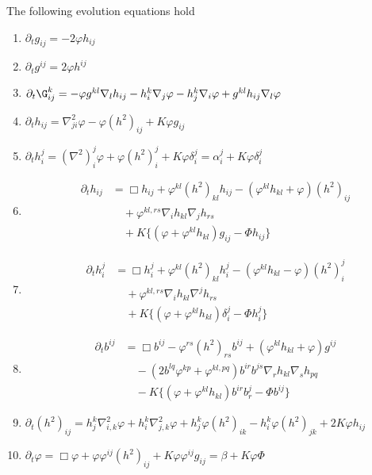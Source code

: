 \documentclass{amsart}
\begin{document}
\begin{lemma}
\label{lem:evolution}
The following evolution equations hold
\begin{enumerate}
\item \label{eq:delt_metric} $\partial_tg_{ij} = -2\varphi h_{ij}$
\item \label{eq:delt_inversemetric} $\partial_t g^{ij} = 2\varphi h^{ij}$
\item \label{eq:delt_christoffel} $\partial_t {\G}^{k}_{ij} = -\varphi g^{kl} \nabla_l h_{ij} - h^k_i \nabla_j \varphi - h^k_j \nabla_i \varphi + g^{kl} h_{ij} \nabla_l \varphi$
\item \label{eq:delt_sff} $\partial_t h_{ij} = \nabla^2_{ji} \varphi - \varphi(h^2)_{ij} + K \varphi g_{ij}$
\item \label{eq:delt_weingarten} $\partial_t h_i^j = (\nabla^2)^j_i\varphi + \varphi(h^2)_i^j + K \varphi\delta_i^j = \alpha^j_i + K \varphi\delta_i^j$
\item \label{eq:delt_sff_box} \begin{align*}
\partial_t h_{ij} &= \Box h_{ij} + \varphi^{kl} (h^2)_{kl} h_{ij} - (\varphi^{kl}h_{kl} + \varphi) (h^2)_{ij} \\
& \quad + \varphi^{kl,rs}\nabla_i h_{kl}\nabla_j h_{rs} \\
& \quad + K \{(\varphi + \varphi^{kl}h_{kl}) g_{ij} - \Phi h_{ij}\}
\end{align*}
\item \label{eq:delt_weingarten_box} \begin{align*}
\partial_t h_i^j &= \Box h_i^j + \varphi^{kl} (h^2)_{kl} h_i^j - (\varphi^{kl}h_{kl} - \varphi) (h^2)_i^j \\
& \quad + \varphi^{kl,rs}\nabla_i h_{kl}\nabla^j h_{rs} \\
& \quad + K \{(\varphi + \varphi^{kl}h_{kl}) \delta_i^j - \Phi h_i^j\}
\end{align*}
\item \label{eq:delt_inversesff} \begin{align*}
\partial_t b^{ij} &= \Box b^{ij} - \varphi^{rs} (h^2)_{rs} b^{ij} + (\varphi^{kl}h_{kl} + \varphi) g^{ij} \\  
& \quad - \left(2b^{lq}\varphi^{kp} + \varphi^{kl,pq}\right) b^{ir}b^{js} \nabla_r h_{kl} \nabla_s h_{pq} \\
& \quad - K \{(\varphi + \varphi^{kl}h_{kl}) b^{ir}b^{j}_{r} - \Phi b^{ij}\}
\end{align*}
\item \label{eq:delt_squaredsff} $\partial_t (h^2)_{ij} = h^k_j \nabla^2_{i,k} \varphi + h^k_i \nabla^2_{j,k} \varphi + h^k_j \varphi(h^2)_{ik} - h^k_i \varphi(h^2)_{jk} + 2K\varphi h_{ij}$
\item \label{eq:delt_speed} $\partial_t \varphi = \Box \varphi + \varphi\varphi^{ij}(h^2)_{ij} + K \varphi\varphi^{ij}g_{ij} = \beta + K\varphi\Phi$
\end{enumerate}
\end{lemma}
\end{document}
